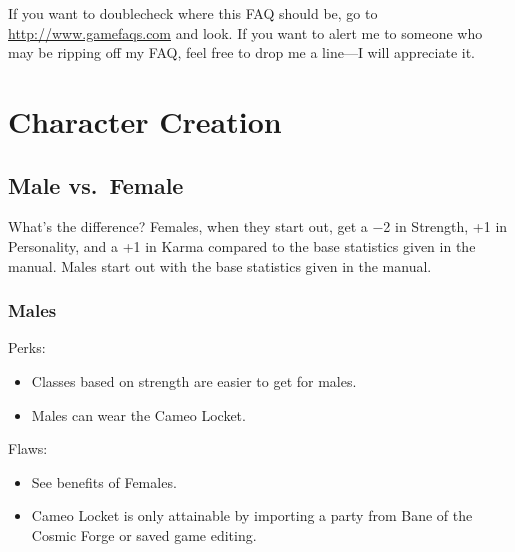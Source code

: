 \documentclass[11pt]{report}
\newcommand{\WviiNeedSpace}{\Needspace*{4\baselineskip+\parskip}}
\newcommand{\WviiTwoColumnSetup}{\raggedcolumns\RaggedRight}
\begin{document}
If you want to doublecheck where this FAQ should be, go to
\url{http://www.gamefaqs.com} and look. If you want to alert me to
someone who may be ripping off my FAQ, feel free to drop me a line---I
will appreciate it.

\clearpage
\begin{multicols}{2}\RaggedRight
\tableofcontents
\end{multicols}

\chapter{Character Creation}\label{character-creation}%
%
\section{Male vs.~Female}\label{male-vs.female}%
%
What's the difference? Females, when they start out, get a −2 in
Strength, +1 in Personality, and a +1 in Karma compared to the base
statistics given in the manual. Males start out with the base statistics
given in the manual.

\subsection{Males}\label{males}%
%
\begin{multicols}{2}\WviiTwoColumnSetup
\WviiNeedSpace{}Perks:%
\begin{itemize}
\item
  Classes based on strength are easier to get for males.
\item
  Males can wear the Cameo Locket.
\end{itemize}
\columnbreak

\WviiNeedSpace{}Flaws:%
\begin{itemize}
\item
  See benefits of Females.
\item
  Cameo Locket is only attainable by importing a party from Bane of the
  Cosmic Forge or saved game editing.
\end{itemize}
\end{multicols}
\end{document}
